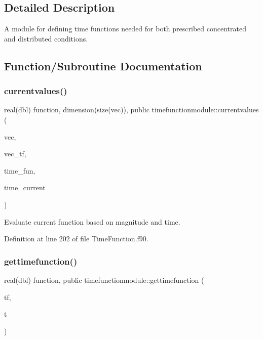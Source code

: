 \subsection{Detailed Description}
A module for defining time functions needed for both prescribed concentrated and distributed conditions. 

\subsection{Function/\+Subroutine Documentation}
\mbox{\label{namespacetimefunctionmodule_a907e0921288aa4f538e605c521686e4a}} 
\subsubsection{\texorpdfstring{currentvalues()}{currentvalues()}}
{\footnotesize\ttfamily real(dbl) function, dimension(size(vec)), public timefunctionmodule\+::currentvalues (\begin{DoxyParamCaption}\item[{real(dbl), dimension(\+:), intent(in)}]{vec,  }\item[{integer, dimension(\+:), intent(in)}]{vec\+\_\+tf,  }\item[{type (\hyperlink{structtimefunctionmodule_1_1timefunction}{timefunction}), dimension(\+:), intent(in)}]{time\+\_\+fun,  }\item[{real(dbl), intent(in)}]{time\+\_\+current }\end{DoxyParamCaption})}



Evaluate current function based on magnitude and time. 



Definition at line 202 of file Time\+Function.\+f90.

\mbox{\label{namespacetimefunctionmodule_a177d2096c59b79cbbfd85b4e05b57f29}} 
\subsubsection{\texorpdfstring{gettimefunction()}{gettimefunction()}}
{\footnotesize\ttfamily real(dbl) function, public timefunctionmodule\+::gettimefunction (\begin{DoxyParamCaption}\item[{type (\hyperlink{structtimefunctionmodule_1_1timefunction}{timefunction}), intent(in)}]{tf,  }\item[{real(dbl), intent(in)}]{t }\end{DoxyParamCaption})}



